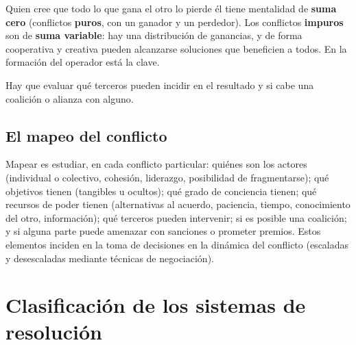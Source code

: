 \documentclass[12pt,oneside]{book}
\begin{document}
\begin{description}[leftmargin=0pt,style=nextline]
\item[Suma cero y suma variable.] Quien cree que todo lo que gana el otro lo pierde él tiene mentalidad de \textbf{suma cero} (conflictos \textbf{puros}, con un ganador y un perdedor). Los conflictos \textbf{impuros} son de \textbf{suma variable}: hay una distribución de ganancias, y de forma cooperativa y creativa pueden alcanzarse soluciones que beneficien a todos. En la formación del operador está la clave.
\item[Terceros y coaliciones.] Hay que evaluar qué terceros pueden incidir en el resultado y si cabe una coalición o alianza con alguno.
\end{description}

\subsection{El mapeo del conflicto}

Mapear es estudiar, en cada conflicto particular: quiénes son los actores (individual o colectivo, cohesión, liderazgo, posibilidad de fragmentarse); qué objetivos tienen (tangibles u ocultos); qué grado de conciencia tienen; qué recursos de poder tienen (alternativas al acuerdo, paciencia, tiempo, conocimiento del otro, información); qué terceros pueden intervenir; si es posible una coalición; y si alguna parte puede amenazar con sanciones o prometer premios. Estos elementos inciden en la toma de decisiones en la dinámica del conflicto (escaladas y desescaladas mediante técnicas de negociación).

\section{Clasificación de los sistemas de resolución}
\end{document}
